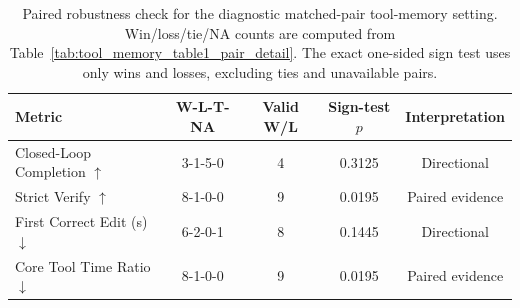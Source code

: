 \begin{table}[H]
\centering
\small
\setlength{\tabcolsep}{6pt}
\renewcommand{\arraystretch}{1.03}
\caption{Paired robustness check for the diagnostic matched-pair tool-memory
setting. Win/loss/tie/NA counts are computed from
Table~\ref{tab:tool_memory_table1_pair_detail}. The exact one-sided sign test
uses only wins and losses, excluding ties and unavailable pairs.}
\label{tab:tool_memory_paired_robustness}
\begin{tabular}{lcccc}
\toprule
Metric & W-L-T-NA & Valid W/L & Sign-test $p$ & Interpretation \\
\midrule
Closed-Loop Completion $\uparrow$ & 3-1-5-0 & 4 & 0.3125 & Directional \\
Strict Verify $\uparrow$ & 8-1-0-0 & 9 & 0.0195 & Paired evidence \\
First Correct Edit (s) $\downarrow$ & 6-2-0-1 & 8 & 0.1445 & Directional \\
Core Tool Time Ratio $\downarrow$ & 8-1-0-0 & 9 & 0.0195 & Paired evidence \\
\bottomrule
\end{tabular}
\end{table}
